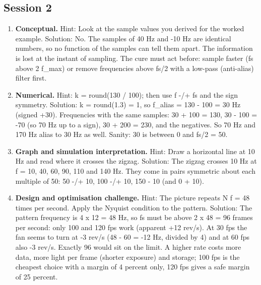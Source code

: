 \documentclass[11pt,a4paper]{article}
\begin{document}
\subsection*{Session 2}
\begin{enumerate}[nosep]
\item \textbf{Conceptual.} Hint: Look at the sample values you derived for the worked example. Solution: No. The samples of 40 Hz and -10 Hz are identical numbers, so no function of the samples can tell them apart. The information is lost at the instant of sampling. The cure must act before: sample faster (fs above 2 f\_max) or remove frequencies above fs/2 with a low-pass (anti-alias) filter first.
\item \textbf{Numerical.} Hint: k = round(130 / 100); then use f -/+ fs and the sign symmetry. Solution: k = round(1.3) = 1, so f\_alias = \textbar{}130 - 100\textbar{} = 30 Hz (signed +30). Frequencies with the same samples: 30 + 100 = 130, 30 - 100 = -70 (so 70 Hz up to a sign), 30 + 200 = 230, and the negatives. So 70 Hz and 170 Hz alias to 30 Hz as well. Sanity: 30 is between 0 and fs/2 = 50.
\item \textbf{Graph and simulation interpretation.} Hint: Draw a horizontal line at 10 Hz and read where it crosses the zigzag. Solution: The zigzag crosses 10 Hz at f = 10, 40, 60, 90, 110 and 140 Hz. They come in pairs symmetric about each multiple of 50: 50 -/+ 10, 100 -/+ 10, 150 - 10 (and 0 + 10).
\item \textbf{Design and optimisation challenge.} Hint: The picture repeats N f = 48 times per second. Apply the Nyquist condition to the pattern. Solution: The pattern frequency is 4 x 12 = 48 Hz, so fs must be above 2 x 48 = 96 frames per second: only 100 and 120 fps work (apparent +12 rev/s). At 30 fps the fan seems to turn at -3 rev/s (48 - 60 = -12 Hz, divided by 4) and at 60 fps also -3 rev/s. Exactly 96 would sit on the limit. A higher rate costs more data, more light per frame (shorter exposure) and storage; 100 fps is the cheapest choice with a margin of 4 percent only, 120 fps gives a safe margin of 25 percent.
\end{enumerate}
\end{document}
